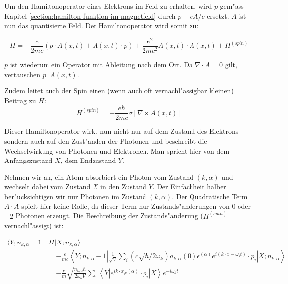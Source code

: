 Um den Hamiltonoperator eines Elektrons im Feld zu erhalten, wird $p$ gem"ass Kapitel \ref{section:hamilton-funktion-im-magnetfeld} durch $p -eA/c$ ersetzt. $A$ ist nun das quantisierte Feld. Der Hamiltonoperator wird somit zu:

\begin{equation}
H = -\frac{e}{2mc}(p \cdot A(x, t) + A(x, t) \cdot p) + \frac{e^2}{2mc^2}A(x, t) \cdot A(x, t) + H^{(spin)}
\end{equation}

$p$ ist wiederum ein Operator mit Ableitung nach dem Ort. Da $\nabla \cdot A = 0$ gilt, vertauschen $p \cdot A(x, t)$.

Zudem leitet auch der Spin einen (wenn auch oft vernachl"assigbar kleinen) Beitrag zu $H$:
\begin{equation}
H^{(spin)} = - \frac{e \hbar}{2mc}\sigma \left[\nabla \times A(x, t)\right]
\end{equation}

Dieser Hamiltonoperator wirkt nun nicht nur auf dem Zustand des Elektrons sondern auch auf den Zust"anden der Photonen und beschreibt die Wechselwirkung von Photonen und Elektronen. Man spricht hier von dem Anfangszustand $X$, dem Endzustand $Y$.

Nehmen wir an, ein Atom absorbiert ein Photon vom Zustand $(k,\alpha)$ und wechselt dabei vom Zustand $X$ in den Zustand $Y$. Der Einfachheit halber ber"ucksichtigen wir nur Photonen im Zustand $(k,\alpha)$. Der Quadratische Term $A \cdot A$ spielt hier keine Rolle, da dieser Term nur Zustands"anderungen von $0$ oder $\pm 2$ Photonen erzeugt. Die Beschreibung der Zustands"anderung ($H^{(spin)}$ vernachl"assigt) ist:

\begin{equation}
\begin{split}
\langle Y; n_{k,\alpha} - 1 &| H | X; n_{k,\alpha} \rangle \\
&= -\frac{e}{mc} \left\langle Y; n_{k,\alpha} - 1 \left| 
\frac{1}{\sqrt{V}} \sum_i \left(c \sqrt{\hbar/2 \omega_k}\right)a_{k,\alpha}(0) \epsilon^{(\alpha)} e^{i(k \cdot x-\omega_k t)} \cdot p_i 
\right| X; n_{k,\alpha} \right\rangle\\
&= -\frac{e}{m} \sqrt{\frac{n_{k,\alpha} \hbar}{2 \omega_k V}} \sum_i \left\langle Y \left| 
e^{ik \cdot x} \epsilon^{(\alpha)} \cdot p_i 
\right| X \right\rangle e^{-i\omega_k t}
\end{split}
\end{equation}

